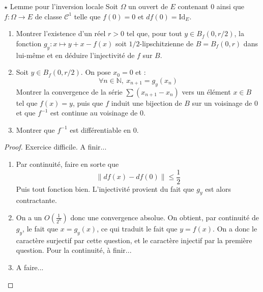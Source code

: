 \documentclass[french,a4paper]{article}
\newcommand{\N}{\mathbb{N}}
\newcommand{\inv}{^{-1}}
\theoremstyle{plain}
\theoremstyle{definition}
\theoremstyle{remark}
\begin{document}
\begin{ex}[Moulin.17]{$\star$ Lemme pour l'inversion locale}
	Soit $\Omega$ un ouvert de $E$ contenant $0$ ainsi que $f:\Omega\to E$ de classe $\mathcal{C}^1$ telle que $f(0)=0$ et $df(0)=\text{Id}_E$.
	\begin{enumerate}
		\item Montrer l'existence d'un réel $r>0$ tel que, pour tout $y\in B_f(0,r/2)$, la fonction $g_y:x\mapsto y+x-f(x)$ soit $1/2$-lipschitzienne de $B=B_f(0,r)$ dans lui-même et en déduire l'injectivité de $f$ sur $B$.
		\item Soit $y\in B_f(0,r/2)$. On pose $x_0=0$ et : $$\forall n\in\N,\ x_{n+1}=g_y(x_n)$$ Montrer la convergence de la série $\sum(x_{n+1}-x_n)$ vers un élément $x\in B$ tel que $f(x)=y$, puis que $f$ induit une bijection de $B$ sur un voisinage de $0$ et que $f\inv$ est continue au voisinage de $0$.
		\item Montrer que $f\inv$ est différentiable en $0$.
	\end{enumerate}
\end{ex}
\begin{proof}
	Exercice difficile. A finir...
	\begin{enumerate}
		\item Par continuité, faire en sorte que $$\lVert df(x)-df(0)\rVert\leqslant\frac{1}{2}$$ Puis tout fonction bien. L'injectivité provient du fait que $g_y$ est alors contractante.
		\item On a un $O\left(\displaystyle\frac{1}{2^n}\right)$ donc une convergence absolue. On obtient, par continuité de $g_y$, le fait que $x=g_y(x)$, ce qui traduit le fait que $y=f(x)$. On a donc le caractère surjectif par cette question, et le caractère injectif par la première question. Pour la continuité, à finir...
		\item A faire...
	\end{enumerate}
\end{proof}
\end{document}
